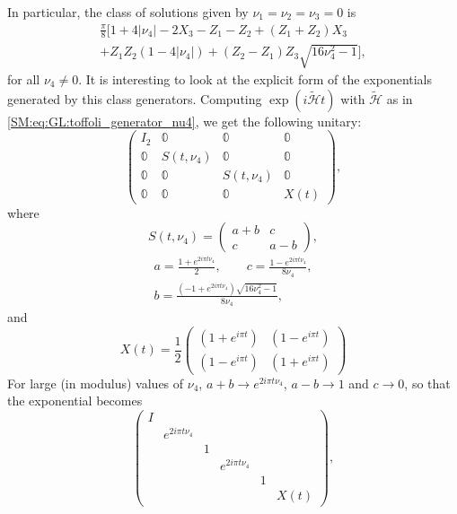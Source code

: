 In particular, the class of solutions given by $\nu_1 = \nu_2 = \nu_3 = 0$ is
\begin{equation}
\begin{split}
	\frac{\pi}{8} \bigg[
	1 + 4\lvert\nu_4\rvert
	- 2 X_3 - Z_1 - Z_2
	+ (Z_1 + Z_2) X_3 \\
	+ Z_1 Z_2 (1 - 4\lvert\nu_4 \rvert)
	+ (Z_2 - Z_1) Z_3 \sqrt{16\nu_4^2 - 1}
	\bigg],
\end{split}
\label{SM:eq:GL:toffoli_generator_nu4}
\end{equation}
for all $\nu_4\neq 0$.
It is interesting to look at the explicit form of the exponentials
generated by this class generators.
Computing $\exp(i \tilde{\mathcal H} t)$ with $\tilde{\mathcal H}$ as in \cref{SM:eq:GL:toffoli_generator_nu4}, we get the following unitary:
\begin{equation}
	\begin{pmatrix}
		I_2 & \mathbb0 & \mathbb0 & \mathbb0 \\
		\mathbb0 & S(t, \nu_4) & \mathbb0 & \mathbb0 \\
		\mathbb0 & \mathbb0 & S(t, \nu_4) & \mathbb0 \\
		\mathbb0 & \mathbb0 & \mathbb0 & X(t)
	\end{pmatrix},
\end{equation}
where
\begin{equation}
	S(t, \nu_4) = \begin{pmatrix}
		a + b & c \\
		c & a - b
	\end{pmatrix},
\end{equation}
\begin{equation}
\begin{gathered}
	a = \frac{1 + e^{2i\pi t \nu_4}}{2},
	\qquad c = \frac{1 - e^{2i\pi t \nu_4}}{8\nu_4},  \\
	b = \frac{(-1 + e^{2i\pi t \nu_4})\sqrt{16\nu_4^2 - 1}}{8\nu_4},
\end{gathered}
\end{equation}
and
\begin{equation}
	X(t) = \frac{1}{2} \begin{pmatrix}
		(1 + e^{i\pi t}) & (1 - e^{i\pi t}) \\
		(1 - e^{i\pi t}) & (1 + e^{i\pi t})
	\end{pmatrix}
\end{equation}
For large (in modulus) values of $\nu_4$,
$a + b \to e^{2i\pi t \nu_4}$, $a - b \to 1$ and $c\to0$,
so that the exponential becomes
\begin{equation}
	\begin{pmatrix}
		I & & & & &\\
		& e^{2i\pi t \nu_4} & & & & \\
		& & 1 & & & \\
		& & & e^{2i\pi t \nu_4} & & \\
		& & & & 1 & \\
		& & & & & X(t)
	\end{pmatrix},
\end{equation}
